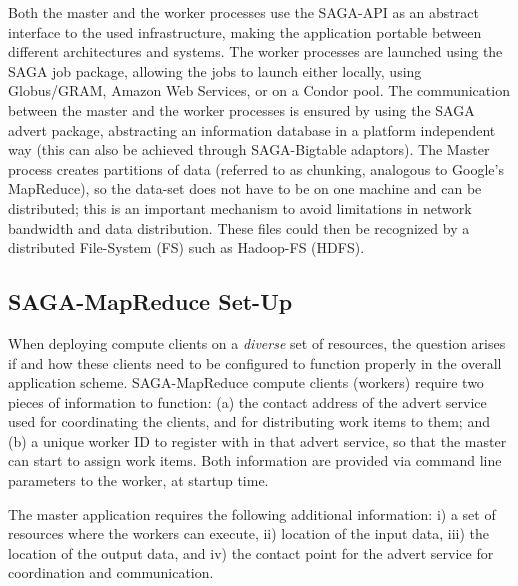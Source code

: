 \documentclass[conference,final]{IEEEtran}
\newcommand{\sagamapreduce }{SAGA-MapReduce }
\newcommand{\I}[1]{\textit{#1}}
\begin{document}
Both the master and the worker processes use the SAGA-API as an
abstract interface to the used infrastructure, making the application
portable between different architectures and systems. The worker
processes are launched using the SAGA job package, allowing the jobs
to launch either locally, using Globus/GRAM, Amazon Web Services, or
on a Condor pool. The communication between the master and the worker
processes is ensured by using the SAGA advert package, abstracting an
information database in a platform independent way (this can also be
achieved through SAGA-Bigtable adaptors).  The Master process creates
partitions of data (referred to as chunking, analogous to Google's
MapReduce), so the data-set does not have to be on one machine and can
be distributed; this is an important mechanism to avoid limitations in
network bandwidth and data distribution.  These files could then be
recognized by a distributed File-System (FS) such as Hadoop-FS
(HDFS). %

\subsection{\sagamapreduce Set-Up}
When deploying compute clients on a \I{diverse} set of resources, the
question arises if and how these clients need to be configured to
function properly in the overall application scheme.  \sagamapreduce
compute clients (workers) require two pieces of information to
function: (a) the contact address of the advert service used for
coordinating the clients, and for distributing work items to them; and
(b) a unique worker ID to register with in that advert service, so
that the master can start to assign work items.  Both information are
provided via command line parameters to the worker, at startup time.

The master application requires the following additional information:
i) a set of resources where the workers can execute, ii) location of
the input data, iii) the location of the output data, and iv) the
contact point for the advert service for coordination and
communication.  
\end{document}
